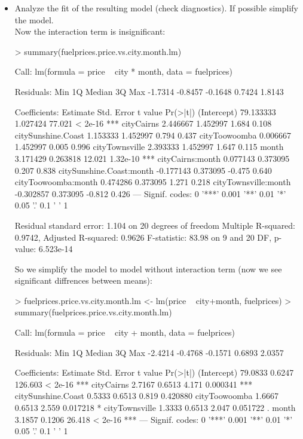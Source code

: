 \documentclass[a4paper]{article}
\begin{document}
\begin{itemize}
\item  Analyze the fit of the resulting model (check diagnostics). If possible
simplify the model.\\

Now the interaction term is insignificant:
\begin{Schunk}
\begin{Sinput}
> summary(fuelprices.price.vs.city.month.lm)	
\end{Sinput}
\begin{Soutput}
Call:
lm(formula = price ~ city * month, data = fuelprices)

Residuals:
    Min      1Q  Median      3Q     Max 
-1.7314 -0.8457 -0.1648  0.7424  1.8143 

Coefficients:
                          Estimate Std. Error t value Pr(>|t|)    
(Intercept)              79.133333   1.027424  77.021  < 2e-16 ***
cityCairns                2.446667   1.452997   1.684    0.108    
citySunshine.Coast        1.153333   1.452997   0.794    0.437    
cityToowoomba             0.006667   1.452997   0.005    0.996    
cityTownsville            2.393333   1.452997   1.647    0.115    
month                     3.171429   0.263818  12.021 1.32e-10 ***
cityCairns:month          0.077143   0.373095   0.207    0.838    
citySunshine.Coast:month -0.177143   0.373095  -0.475    0.640    
cityToowoomba:month       0.474286   0.373095   1.271    0.218    
cityTownsville:month     -0.302857   0.373095  -0.812    0.426    
---
Signif. codes:  0 '***' 0.001 '**' 0.01 '*' 0.05 '.' 0.1 ' ' 1

Residual standard error: 1.104 on 20 degrees of freedom
Multiple R-squared:  0.9742,	Adjusted R-squared:  0.9626 
F-statistic: 83.98 on 9 and 20 DF,  p-value: 6.523e-14
\end{Soutput}
\end{Schunk}
So we simplify the model to model without interaction term (now we see
significant diffrences between means):
\begin{Schunk}
\begin{Sinput}
> fuelprices.price.vs.city.month.lm <- lm(price ~ city+month, fuelprices)
> summary(fuelprices.price.vs.city.month.lm)	
\end{Sinput}
\begin{Soutput}
Call:
lm(formula = price ~ city + month, data = fuelprices)

Residuals:
    Min      1Q  Median      3Q     Max 
-2.4214 -0.4768 -0.1571  0.6893  2.0357 

Coefficients:
                   Estimate Std. Error t value Pr(>|t|)    
(Intercept)         79.0833     0.6247 126.603  < 2e-16 ***
cityCairns           2.7167     0.6513   4.171 0.000341 ***
citySunshine.Coast   0.5333     0.6513   0.819 0.420880    
cityToowoomba        1.6667     0.6513   2.559 0.017218 *  
cityTownsville       1.3333     0.6513   2.047 0.051722 .  
month                3.1857     0.1206  26.418  < 2e-16 ***
---
Signif. codes:  0 '***' 0.001 '**' 0.01 '*' 0.05 '.' 0.1 ' ' 1


\end{Soutput}
\end{Schunk}
\end{itemize}
\end{document}

